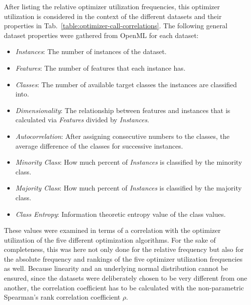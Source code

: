 After listing the relative optimizer utilization frequencies, this optimizer utilization is considered in the context of the different datasets and their properties in Tab.~\ref{table:optimizer-call-correlations}.
The following general dataset properties were gathered from OpenML for each dataset:
\begin{itemize}
    \item \textit{Instances}: The number of instances of the dataset.
    \item \textit{Features}: The number of features that each instance has.
    \item \textit{Classes}: The number of available target classes the instances are classified into.
    \item \textit{Dimensionality}: The relationship between features and instances that is calculated via \textit{Features} divided by \textit{Instances}.
    \item \textit{Autocorrelation}: After assigning consecutive numbers to the classes, the average difference of the classes for successive instances.
    \item \textit{Minority Class}: How much percent of \textit{Instances} is classified by the minority class.
    \item \textit{Majority Class}: How much percent of \textit{Instances} is classified by the majority class.
    \item \textit{Class Entropy}: Information theoretic entropy value of the class values.
\end{itemize}
These values were examined in terms of a correlation with the optimizer utilization of the five different optimization algorithms.
For the sake of completeness, this was here not only done for the relative frequency but also for the absolute frequency and rankings of the five optimizer utilization frequencies as well.\newline
Because linearity and an underlying normal distribution cannot be ensured, since the datasets were deliberately chosen to be very different from one another, the correlation coefficient has to be calculated with the non-parametric Spearman's rank correlation coefficient $\rho$.

